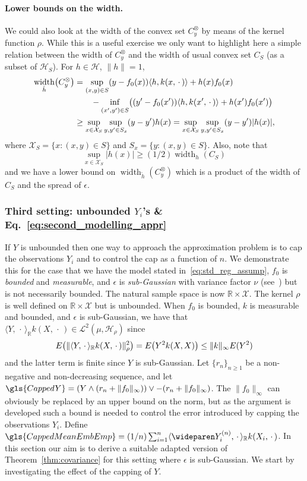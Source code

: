 \documentclass[AHL,Unicode,longabstracts,published]{cedram}
\theoremstyle{remark}
\DeclareMathOperator*{\infd}{inf\vphantom{p}}
\DeclareMathOperator{\diam}{width}
\newcommand{\R}{\mathbb{R}}
\newcommand{\X}{\mathcal{X}}
\newcommand{\cH}{\mathcal{H}}
\newcommand{\clL}{\mathcal{L}}
\let\originalleft\left
\let\originalright\right
\renewcommand{\left}{\mathopen{}\mathclose\bgroup\originalleft}
\renewcommand{\right}{\aftergroup\egroup\originalright}
\begin{document}
\paragraph{Lower bounds on the width.} We could also look at the width of the convex set $C_y^\otimes$ by means of the kernel function $\rho$. While this is a useful exercise we only want to highlight here a simple relation between the width of $C_y^\otimes$ and the width of usual convex set $C_S$ (as a subset of $\cH_S$). For $h \in \cH$, $\|h\|=1$,
\begin{align*}
\diam_{\check h} \left(C_y^\otimes\right) &= \sup_{(x,y) \in S} (y - f_0(x)) \langle h, k(x,\,\cdot\,) \rangle + h(x) f_0(x) \\
&\qquad - \infd_{(x',y') \in S} \bigl((y' - f_0(x')) \langle h, k(x',\,\cdot\,) \rangle + h(x') f_0(x')\bigr) \\
&\geq \sup_{x \in \X_S} \sup_{y,y' \in S_x} (y-y') h(x) = \sup_{x \in \X_S} \sup_{y,y' \in S_x} (y-y') |h(x)|,
\end{align*}
where $\X_S = \{x: (x,y) \in S\}$ and $S_x = \{ y : (x,y) \in S\}$. Also, note that
\[
\sup_{x\in \X_S} |h(x)| \geq (1/2) \diam_h(C_S)
\]
and we have a lower bound on $\diam_{\check h} (C_y^\otimes)$ which is a product of the width of $C_S$ and the spread of $\epsilon$.



\subsubsection{Third setting: unbounded \texorpdfstring{$Y_i$}{Y\_i}'s \& Eq.~\eqref{eq:second_modelling_appr}} \label{sec:unbounded_Y}
If $Y$ is unbounded then one way to approach the approximation problem is to cap the observations $Y_i$ and to control the cap as a function of $n$. We demonstrate this for the case that we have the model stated in~\eqref{eq:std_reg_assump}, $f_0$ is \emph{bounded} and \emph{measurable}, and $\epsilon$ is \emph{sub-Gaussian} with variance factor $\nu$ (see~\cite[Section~2.3]{GAB13}) but is not necessarily bounded. The natural sample space is now $\R \times \X$. The kernel $\rho$ is well defined on $\R \times \X$ but is unbounded. When $f_0$ is bounded, $k$ is measurable and bounded, and $\epsilon$ is sub-Gaussian, we have that $\langle Y,\,\cdot\,\rangle_\R k(X,\,\cdot\,) \in \clL^2(\mu,\cH_\rho)$ since
\[
E\left(\| \langle Y,\,\cdot\,\rangle_\R k(X,\,\cdot\,) \|_\rho^2\right) = E\left(Y^2 k(X,X)\right) \leq \|k\|_\infty E(Y^2)
\]
and the latter term is finite since $Y$ is sub-Gaussian. Let $\{r_n\}_{n \geq 1}$ be a non-negative and non-decreasing sequence, and let $\gls{CappedY} = (Y \wedge (r_n + \|f_0\|_\infty)) \vee - (r_n + \|f_0\|_\infty)$. The $\|f_0\|_\infty$ can obviously be replaced by an upper bound on the norm, but as the argument is developed such a bound is needed to control the error introduced by capping the observations $Y_i$. Define $ \gls{CappedMeanEmbEmp} = (1/n) \sum_{i=1}^n \langle \wideparen Y^{(n)}_i, \,\cdot\, \rangle_\R k(X_i, \,\cdot\,)$. In this section our aim is to derive a suitable adapted version of Theorem~\ref{thm:covariance} for this setting where $\epsilon$ is sub-Gaussian. We start by investigating the effect of the capping of $Y$.
\end{document}
